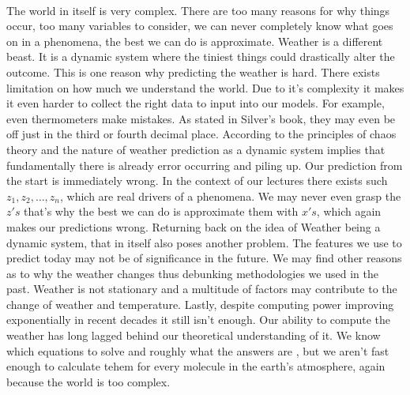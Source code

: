 \documentclass[12pt]{article}
\begin{document}

\begin{enumerate}

 \\
The world in itself is very complex. There are too many reasons for why things occur, too many variables to consider, we can never completely know what goes on in a phenomena, the best we can do is approximate. Weather is a different beast. It is a dynamic system where the tiniest things could drastically alter the outcome. This is one reason why predicting the weather is hard. There exists limitation on how much we  understand the world. Due to it's complexity it makes it even harder to collect the right data to input into our models. For example, even thermometers make mistakes. As stated in Silver's book, they may even be off just in the third or fourth decimal place. According to the principles of chaos theory and the nature of weather prediction as a dynamic system implies that fundamentally there is already error occurring and piling up. Our prediction from the start is immediately wrong. In the context of our lectures there exists such \( z_1, z_2, \ldots, z_n \), which are real drivers of a phenomena. We may never even grasp the \( z's \) that's why the best we can do is approximate them with \( x's \), which again makes our predictions wrong. Returning back on the idea of Weather being a dynamic system, that in itself also poses another problem. The features we use to predict today may not be of significance in the future. We may find other reasons as to why the weather changes thus debunking methodologies we used in the past. Weather is not stationary and a multitude of factors may contribute to the change of weather and temperature. Lastly, despite computing power improving exponentially in recent decades it still isn't enough. Our ability to compute the weather has long lagged behind our theoretical understanding of it. We know which equations to solve and roughly what the answers are , but we aren't fast enough to calculate tehem for every molecule in the earth's atmosphere, again because the world is too complex. \\


\end{enumerate}
\end{document}
